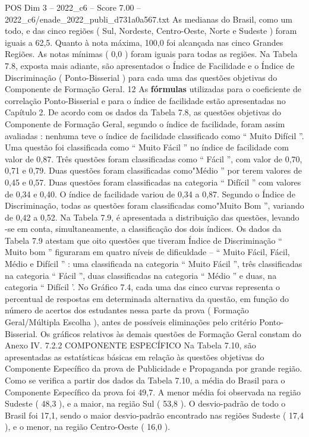 \begin{textsample}{POS Dim 3 – 2022\_c6 – Score 7.00 – 2022\_c6/enade\_2022\_publi\_d731a0a567.txt}
As medianas do Brasil, como um todo, e das cinco regiões ( Sul, Nordeste, Centro-Oeste, Norte e Sudeste ) foram iguais a 62,5.
Quanto à nota máxima, 100,0 foi alcançada nas cinco Grandes Regiões.
As notas mínimas ( 0,0 ) foram iguais para todas as regiões.
Na Tabela 7.8, exposta mais adiante, são apresentados o Índice de Facilidade e o Índice de Discriminação ( Ponto-Bisserial ) para cada uma das questões objetivas do Componente de Formação Geral. 12 As \textbf{fórmulas} utilizadas para o coeficiente de correlação Ponto-Bisserial e para o índice de facilidade estão apresentadas no Capítulo 2.
De acordo com os dados da Tabela 7.8, as questões objetivas do Componente de Formação Geral, segundo o índice de facilidade, foram assim avaliadas : nenhuma teve o índice de facilidade classificado como “ Muito Difícil ”.
Uma questão foi classificada como “ Muito Fácil ” no índice de facilidade com valor de 0,87.
Três questões foram classificadas como “ Fácil ”, com valor de 0,70, 0,71 e 0,79.
Duas questões foram classificadas como"Médio ” por terem valores de 0,45 e 0,57.
Duas questões foram classificadas na categoria “ Difícil ” com valores de 0,34 e 0,40.
O índice de facilidade variou de 0,34 a 0,87.
Segundo o Índice de Discriminação, todas as questões foram classificadas como"Muito Bom ”, variando de 0,42 a 0,52.
Na Tabela 7.9, é apresentada a distribuição das questões, levando -se em conta, simultaneamente, a classificação dos dois índices.
Os dados da Tabela 7.9 atestam que oito questões que tiveram Índice de Discriminação “ Muito bom ” figuraram em quatro níveis de dificuldade – “ Muito Fácil, Fácil, Médio e Difícil ” : uma classificada na categoria “ Muito Fácil ”, três classificadas na categoria “ Fácil ”, duas classificadas na categoria “ Médio ” e duas, na categoria “ Difícil ’.
No Gráfico 7.4, cada uma das cinco curvas representa o percentual de respostas em determinada alternativa da questão, em função do número de acertos dos estudantes nessa parte da prova ( Formação Geral/Múltipla Escolha ), antes de possíveis eliminações pelo critério Ponto-Bisserial.
Os gráficos relativos às demais questões de Formação Geral constam do Anexo IV. 7.2.2 COMPONENTE ESPECÍFICO Na Tabela 7.10, são apresentadas as estatísticas básicas em relação às questões objetivas do Componente Específico da prova de Publicidade e Propaganda por grande região.
Como se verifica a partir dos dados da Tabela 7.10, a média do Brasil para o Componente Específico da prova foi 49,7.
A menor média foi observada na região Sudeste ( 48,3 ), e a maior, na região Sul ( 53,8 ).
O desvio-padrão de todo o Brasil foi 17,1, sendo o maior desvio-padrão encontrado nas regiões Sudeste ( 17,4 ), e o menor, na região Centro-Oeste ( 16,0 ).

\end{textsample}
